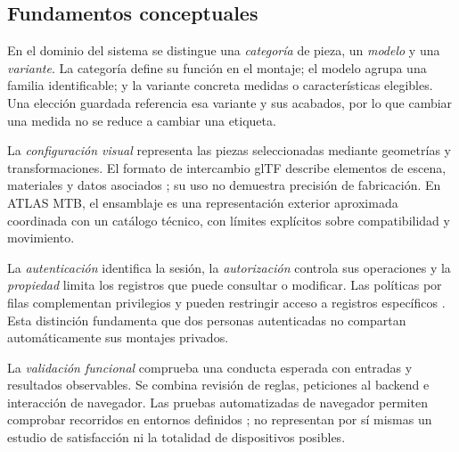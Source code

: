 \documentclass[12pt,letterpaper]{article}
\begin{document}
\subsection{Fundamentos conceptuales}
En el dominio del sistema se distingue una \textit{categoría} de pieza, un \textit{modelo} y una \textit{variante}. La categoría define su función en el montaje; el modelo agrupa una familia identificable; y la variante concreta medidas o características elegibles. Una elección guardada referencia esa variante y sus acabados, por lo que cambiar una medida no se reduce a cambiar una etiqueta.

La \textit{configuración visual} representa las piezas seleccionadas mediante geometrías y transformaciones. El formato de intercambio glTF describe elementos de escena, materiales y datos asociados \citep{gltf}; su uso no demuestra precisión de fabricación. En ATLAS MTB, el ensamblaje es una representación exterior aproximada coordinada con un catálogo técnico, con límites explícitos sobre compatibilidad y movimiento.

La \textit{autenticación} identifica la sesión, la \textit{autorización} controla sus operaciones y la \textit{propiedad} limita los registros que puede consultar o modificar. Las políticas por filas complementan privilegios y pueden restringir acceso a registros específicos \citep{postgres}. Esta distinción fundamenta que dos personas autenticadas no compartan automáticamente sus montajes privados.

La \textit{validación funcional} comprueba una conducta esperada con entradas y resultados observables. Se combina revisión de reglas, peticiones al backend e interacción de navegador. Las pruebas automatizadas de navegador permiten comprobar recorridos en entornos definidos \citep{playwright}; no representan por sí mismas un estudio de satisfacción ni la totalidad de dispositivos posibles.
\end{document}
